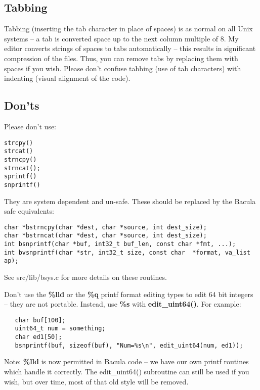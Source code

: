 \subsection{Tabbing}

Tabbing (inserting the tab character in place of spaces) is as normal on all
Unix systems -- a tab is converted space up to the next column multiple of 8.
My editor converts strings of spaces to tabs automatically -- this results in
significant compression of the files. Thus, you can remove tabs by replacing
them with spaces if you wish. Please don't confuse tabbing (use of tab
characters) with indenting (visual alignment of the code). 

\subsection{Don'ts}

Please don't use: 

\footnotesize
\begin{verbatim}
strcpy()
strcat()
strncpy()
strncat();
sprintf()
snprintf()
\end{verbatim}
\normalsize

They are system dependent and un-safe. These should be replaced by the Bacula
safe equivalents: 

\footnotesize
\begin{verbatim}
char *bstrncpy(char *dest, char *source, int dest_size);
char *bstrncat(char *dest, char *source, int dest_size);
int bsnprintf(char *buf, int32_t buf_len, const char *fmt, ...);
int bvsnprintf(char *str, int32_t size, const char  *format, va_list ap);
\end{verbatim}
\normalsize

See src/lib/bsys.c for more details on these routines. 

Don't use the {\bf \%lld} or the {\bf \%q} printf format editing types to edit
64 bit integers -- they are not portable. Instead, use {\bf \%s} with {\bf
edit\_uint64()}. For example: 

\footnotesize
\begin{verbatim}
   char buf[100];
   uint64_t num = something;
   char ed1[50];
   bsnprintf(buf, sizeof(buf), "Num=%s\n", edit_uint64(num, ed1));
\end{verbatim}
\normalsize

Note: {\bf \%lld} is now permitted in Bacula code -- we have our
own printf routines which handle it correctly. The edit\_uint64() subroutine
can still be used if you wish, but over time, most of that old style will
be removed.

